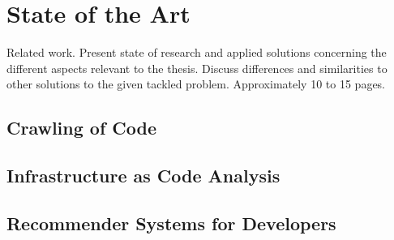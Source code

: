 \chapter{State of the Art}
Related work. Present state of research and applied solutions concerning the different aspects relevant to the thesis. Discuss differences and similarities to other solutions to the given tackled problem. Approximately 10 to 15 pages.


\section{Crawling of Code}
\section{Infrastructure as Code Analysis}
\section{Recommender Systems for Developers}
